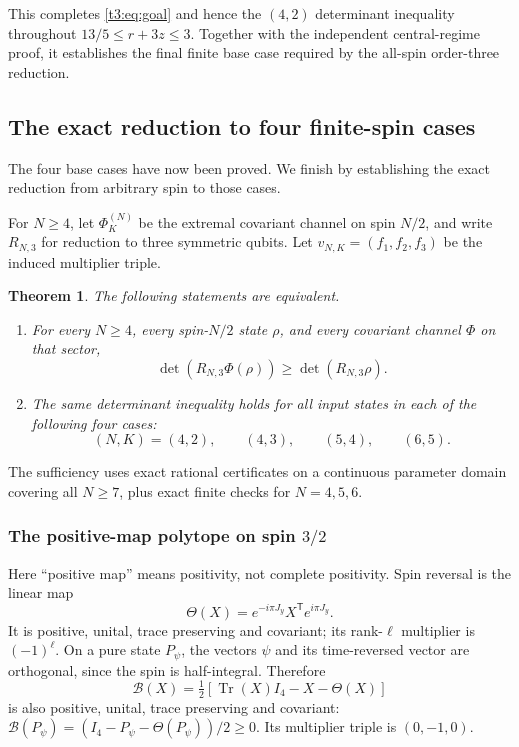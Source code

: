 \documentclass[11pt,a4paper]{article}
\newcommand{\Tr}{\operatorname{Tr}}
\newtheorem{theorem}{Theorem}
\begin{document}
This completes \eqref{t3:eq:goal} and hence the $(4,2)$ determinant
inequality throughout $13/5\le r+3z\le3$. Together with the
independent central-regime proof, it establishes the final finite
base case required by the all-spin order-three reduction.
\subsection{The exact reduction to four finite-spin cases}
The four base cases have now been proved. We finish by establishing
the exact reduction from arbitrary spin to those cases.

For $N\ge4$, let $\Phi_K^{(N)}$ be the extremal covariant channel on
spin $N/2$, and write $R_{N,3}$ for reduction to three symmetric qubits.
Let $v_{N,K}=(f_1,f_2,f_3)$ be the induced multiplier triple.

\begin{theorem}\label{t3:thm:reduction}
The following statements are equivalent.
\begin{enumerate}
\item For every $N\ge4$, every spin-$N/2$ state $\rho$, and every
covariant channel $\Phi$ on that sector,
\[
 \det(R_{N,3}\Phi(\rho))\ge\det(R_{N,3}\rho).
\]
\item The same determinant inequality holds for all input states in
each of the following four cases:
\[
 (N,K)=(4,2),\qquad(4,3),\qquad(5,4),\qquad(6,5).
\]
\end{enumerate}
\end{theorem}

The sufficiency uses exact rational certificates on a continuous
parameter domain covering all $N\ge7$, plus exact finite checks for
$N=4,5,6$.

\subsubsection{The positive-map polytope on spin $3/2$}
Here ``positive map'' means positivity, not complete positivity.
Spin reversal is the linear map
\[
 \Theta(X)=e^{-i\pi J_y}X^{\mathsf T}e^{i\pi J_y}.
\]
It is positive, unital, trace preserving and covariant; its rank-$\ell$
multiplier is $(-1)^\ell$. On a pure state $P_\psi$, the vectors
$\psi$ and its time-reversed vector are orthogonal, since the spin
is half-integral. Therefore
\[
 \mathcal B(X)=\tfrac12[\Tr(X)I_4-X-\Theta(X)]
\]
is also positive, unital, trace preserving and covariant:
$\mathcal B(P_\psi)=(I_4-P_\psi-\Theta(P_\psi))/2\ge0$.
Its multiplier triple is $(0,-1,0)$.
\end{document}
